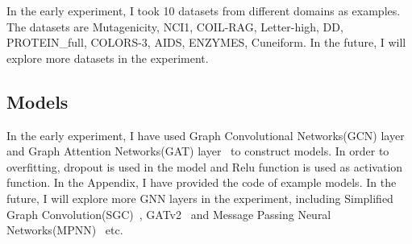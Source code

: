 \documentclass{article}
\begin{document}
In the early experiment, I took 10 datasets from different domains as examples. The datasets are Mutagenicity, NCI1, COIL-RAG, Letter-high, DD, PROTEIN\_full, COLORS-3, AIDS, ENZYMES, Cuneiform. In the future, I will explore more datasets in the experiment.

\subsection{Models}
In the early experiment, I have used Graph Convolutional Networks(GCN) layer~\cite{kipf2017semisupervised} and Graph Attention Networks(GAT) layer~\cite{velickovic2020pointer} to construct models. In order to overfitting, dropout is used in the model and Relu function is used as activation function. In the Appendix, I have provided the code of example models. In the future, I will explore more GNN layers in the experiment, including Simplified Graph Convolution(SGC)~\cite{wu2019simplifying}, GATv2~\cite{brody2021attentive} and Message Passing Neural Networks(MPNN)~\cite{gilmer2017neural} etc.
\end{document}
